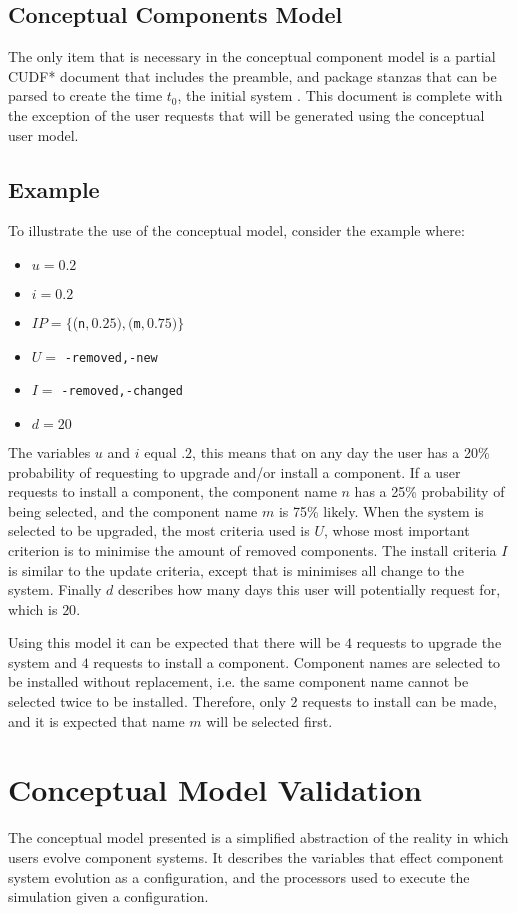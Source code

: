 \subsection{Conceptual Components Model}
The only item that is necessary in the conceptual component model is 
a partial CUDF* document that includes the preamble, and package stanzas that can be parsed to create the time $t_0$, the initial system .
This document is complete with the exception of the user requests that will be generated using the conceptual user model.


\subsection{Example}
To illustrate the use of the conceptual model, consider the example where:
\begin{itemize}
  \item $u = 0.2$
  \item $i = 0.2$
  \item $IP = \{$(\texttt{n}$, 0.25),($\texttt{m}$,0.75)\}$
  \item $U = $ \texttt{-removed,-new}
  \item $I = $ \texttt{-removed,-changed}
  \item $d = 20$
\end{itemize}
The variables $u$ and $i$ equal $.2$, this means that on any day the user has a 20\% probability of requesting to upgrade and/or install a component.
If a user requests to install a component, the component name $n$ has a 25\% probability of being selected, and the component name $m$ is 75\% likely. 
When the system is selected to be upgraded, the most criteria used is $U$, whose most important criterion is to minimise the amount of removed components.
The install criteria $I$ is similar to the update criteria, except that is minimises all change to the system.
Finally $d$ describes how many days this user will potentially request for, which is $20$.

Using this model it can be expected that there will be $4$ requests to upgrade the system and $4$ requests to install a component.
Component names  are selected to be installed without replacement, i.e. the same component name cannot be selected twice to be installed.
Therefore, only $2$ requests to install can be made, and it is expected that name $m$ will be selected first.

\section{Conceptual Model Validation}
The conceptual model presented is a simplified abstraction of the reality in which users evolve component systems.
It describes the variables that effect component system evolution as a configuration,
and the processors used to execute the simulation given a configuration.


